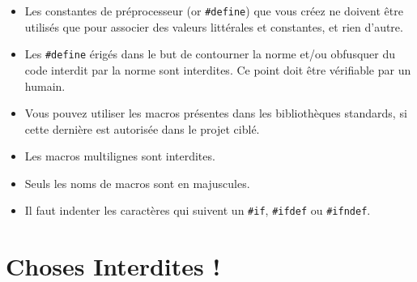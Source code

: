 \documentclass{42-fr}
\begin{document}
        \begin{itemize}

            \item Les constantes de préprocesseur (or \texttt{\#define}) que vous créez ne doivent
                être utilisés que pour associer des valeurs littérales et constantes, et rien d’autre.
            \item Les \texttt{\#define} érigés dans le but de contourner la norme et/ou obfusquer
                du code interdit par la norme sont interdites. 
                Ce point doit être vérifiable par un humain.
            \item Vous pouvez utiliser les macros présentes dans les bibliothèques standards,
                si cette dernière est autorisée dans le projet ciblé.
            \item Les macros multilignes sont interdites.
            \item Seuls les noms de macros sont en majuscules.
            \item Il faut indenter les caractères qui suivent un \texttt{\#if}, \texttt{\#ifdef}
                ou \texttt{\#ifndef}.

        \end{itemize}
        \newpage


    \section{Choses Interdites !}
\end{document}
